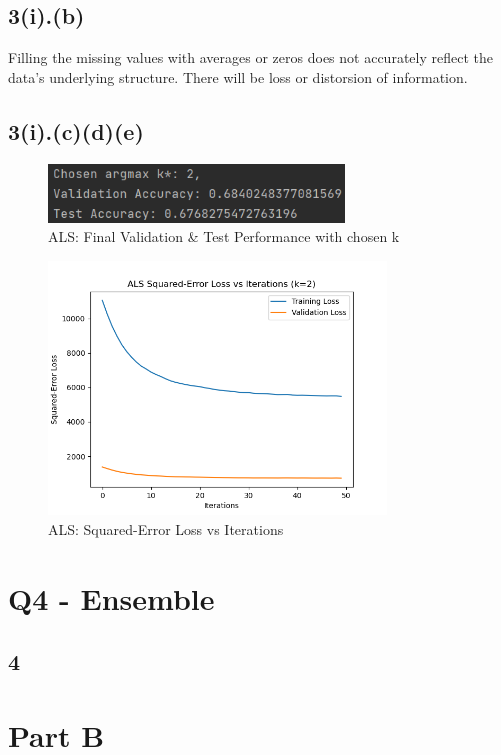 \documentclass{article}
\begin{document}
\subsection*{3(i).(b)}
Filling the missing values with averages or zeros does not accurately reflect the data's underlying structure. There will be loss or distorsion of information.

\subsection*{3(i).(c)(d)(e)}
\begin{figure}[H]
    \centering
    \includegraphics[width=0.7\textwidth]{3(i)(c)(d).png}
    \caption{ALS: Final Validation \& Test Performance with chosen k\*}
\end{figure}
\begin{figure}[H]
    \centering
    \includegraphics[width=0.8\textwidth]{3(i)(e).png}
    \caption{ALS: Squared-Error Loss vs Iterations}
\end{figure}

\newpage
\section*{Q4 - Ensemble}

\subsection*{4}




\newpage
\section*{Part B}
\end{document}
